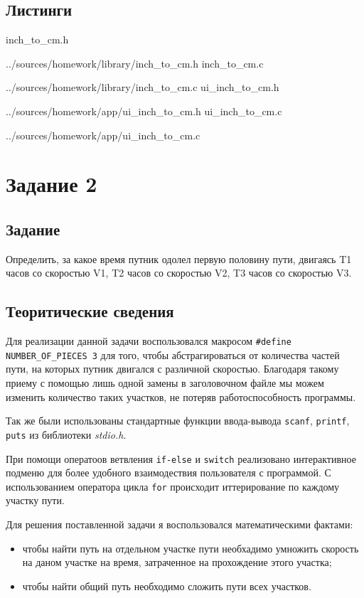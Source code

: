 \documentclass[12pt,a4paper]{report}
\begin{document}
\newpage
\subsection*{Листинги}
inch\_to\_cm.h

{../sources/homework/library/inch_to_cm.h}
inch\_to\_cm.c

{../sources/homework/library/inch_to_cm.c}
ui\_inch\_to\_cm.h

{../sources/homework/app/ui_inch_to_cm.h}
ui\_inch\_to\_cm.c

{../sources/homework/app/ui_inch_to_cm.c}

\newpage

\section{Задание 2}
\subsection{Задание}
Определить, за какое время путник одолел первую половину пути, двигаясь T1 часов со скоростью V1, T2 часов со скоростью V2, T3 часов со скоростью V3.

\subsection{Теоритические сведения}
\hspace{\parindent}Для реализации данной задачи воспользовался макросом \texttt{\#define NUMBER\_OF\_PIECES 3} для того, чтобы абстрагироваться от количества частей пути, на которых путник двигался с различной скоростью. Благодаря такому приему с помощью лишь одной замены в заголовочном файле мы можем изменить количество таких участков, не потеряв работоспособность программы.

Так же были использованы стандартные функции ввода-вывода \texttt{scanf}, \texttt{printf}, \texttt{puts} из библиотеки \textit{stdio.h}.

При помощи оператоов ветвления \texttt{if-else} и \texttt{switch} реализовано интерактивное подменю для более удобного взаимодествия пользователя с программой. С использованием оператора цикла \texttt{for} происходит иттерирование по каждому участку пути.

Для решения поставленной задачи я воспользовался математическими фактами: 
\begin{itemize}
\item чтобы найти путь на отдельном участке пути необхадимо умножить скорость на даном участке на время, затраченное на прохождение этого участка;
\item чтобы найти общий путь необходимо сложить пути всех участков.
\end{itemize}
\end{document}
